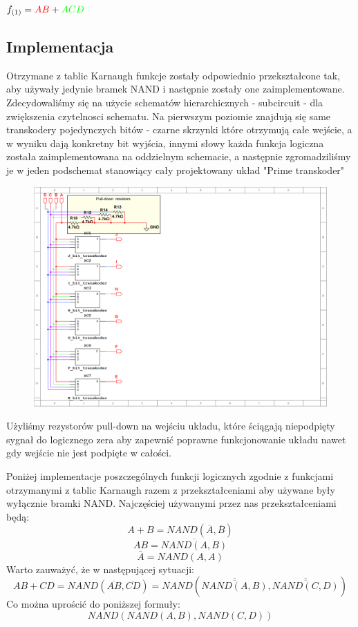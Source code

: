 \documentclass[a4paper]{article}
\begin{document}
  \begin{center}
  $f_{(1)} = \textcolor{red}{AB} + \textcolor{green}{ACD}$
\end{center}
\pagebreak
\subsection{Implementacja}
Otrzymane z tablic Karnaugh funkcje zostały odpowiednio przekształcone tak,
 aby używały jedynie bramek NAND i następnie zostały one zaimplementowane. Zdecydowaliśmy się 
 na użycie schematów hierarchicznych - subcircuit - dla zwiększenia czytelnosci schematu. 
 Na pierwszym poziomie znajdują się same transkodery pojedynczych bitów - czarne skrzynki które otrzymują 
 całe wejście, a w wyniku dają konkretny bit wyjścia, innymi słowy każda funkcja logiczna została zaimplementowana
 na oddzielnym schemacie, a następnie zgromadziliśmy je w jeden podschemat stanowiący cały projektowany układ "Prime transkoder"
\begin{figure}[H]
  \centering
  \includegraphics[width=\textwidth]{prime_transkoder.png}
\end{figure}

Użyliśmy rezystorów pull-down na wejściu układu, które ściągają niepodpięty sygnał do logicznego zera aby 
zapewnić poprawne funkcjonowanie układu nawet gdy wejście nie jest podpięte w całości.

Poniżej implementacje poszczególnych funkcji logicznych zgodnie z funkcjami otrzymanymi z tablic Karnaugh razem z przekształceniami aby używane były wyłącznie bramki NAND.
Najczęściej używanymi przez nas przekształceniami będą:
$$A + B = NAND(\overline{A}, \overline{B})$$
$$AB = \overline{NAND(A,B)}$$
$$\overline{A} = NAND(A,A)$$
Warto zauważyć, że w następującej sytuacji:
$$AB + CD = NAND(\overline{AB}, \overline{CD}) = NAND(\overline{\overline{NAND(A,B)}}, \overline{\overline{NAND(C,D)}})$$
Co można uprościć do poniższej formuły:
$$NAND(NAND(A,B),NAND(C,D))$$
\end{document}
